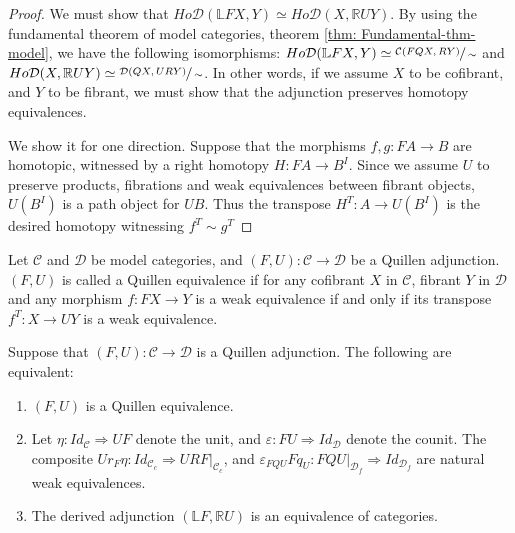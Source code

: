 \documentclass[../thesis.tex]{subfiles}
\begin{document}
            \begin{proof}
                We must show that $Ho\mathcal{D}(\mathbb{L}FX, Y) \simeq Ho\mathcal{D}(X, \mathbb{R}UY)$. By using the fundamental theorem of model categories, theorem \ref{thm: Fundamental-thm-model}, we have the following isomorphisms: $Ho\mathcal{D}(\mathbb{L}FX,Y)\simeq \sfrac{\mathcal{C}(FQX,RY)}{\sim}$ and $Ho\mathcal{D}(X,\mathbb{R}UY)\simeq\sfrac{\mathcal{D}(QX,URY)}{\sim}$. In other words, if we assume $X$ to be cofibrant, and $Y$ to be fibrant, we must show that the adjunction preserves homotopy equivalences.

                We show it for one direction. Suppose that the morphisms $f,g:FA\rightarrow B$ are homotopic, witnessed by a right homotopy $H:FA\rightarrow B^I$. Since we assume $U$ to preserve products, fibrations and weak equivalences between fibrant objects, $U(B^I)$ is a path object for $UB$. Thus the transpose $H^T:A\rightarrow U(B^I)$ is the desired homotopy witnessing $f^T \sim g^T$
            \end{proof}

            \begin{definition}
                Let $\mathcal{C}$ and $\mathcal{D}$ be model categories, and $(F,U):\mathcal{C}\rightarrow\mathcal{D}$ be a Quillen adjunction. $(F,U)$ is called a Quillen equivalence if for any cofibrant $X$ in $\mathcal{C}$, fibrant $Y$ in $\mathcal{D}$ and any morphism $f:FX\rightarrow Y$ is a weak equivalence if and only if its transpose $f^T:X\rightarrow UY$ is a weak equivalence.
            \end{definition}

            \begin{proposition}
                Suppose that $(F,U):\mathcal{C}\rightarrow\mathcal{D}$ is a Quillen adjunction. The following are equivalent:
                \begin{enumerate}
                    \item $(F,U)$ is a Quillen equivalence.
                    \item Let $\eta :Id_\mathcal{C}\Rightarrow UF$ denote the unit, and $\varepsilon :FU\Rightarrow Id_\mathcal{D}$ denote the counit. The composite $Ur_{F}\eta : Id_{\mathcal{C}_c} \Rightarrow URF|_{\mathcal{C}_c}$, and $\varepsilon_{FQU}Fq_{U}:FQU|_{\mathcal{D}_f} \Rightarrow Id_{\mathcal{D}_f}$ are natural weak equivalences.
                    \item The derived adjunction $(\mathbb{L}F, \mathbb{R}U)$ is an equivalence of categories.
                \end{enumerate}
            \end{proposition}
\end{document}
